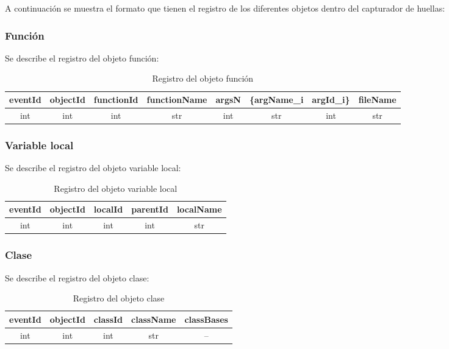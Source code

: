 \documentclass[10pt,a4paper]{article}
\begin{document}
A continuación se muestra el formato que tienen el registro de los diferentes objetos dentro del capturador de huellas:\\

\subsubsection{Función}
Se describe el registro del objeto función:\\

\begin{table}[!h]
\begin{center}
\begin{tabular}{| c | c | c | c | c | c | c | c |}
\hline
eventId & objectId & functionId & functionName & argsN & \{argName_{i} & argId_{i}\} & fileName\\
\hline
int & int & int & str & int & str & int & str\\
\hline
\end{tabular}
\caption{Registro del objeto función} 
\end{center}
\end{table}

\subsubsection{Variable local}
Se describe el registro del objeto variable local:\\

\begin{table}[!h]
\begin{center}
\begin{tabular}{| c | c | c | c | c |}
\hline
eventId & objectId & localId & parentId & localName\\
\hline
int & int & int & int & str\\
\hline
\end{tabular}
\caption{Registro del objeto variable local} 
\end{center}
\end{table}

\subsubsection{Clase}
Se describe el registro del objeto clase:\\

\begin{table}[!h]
\begin{center}
\begin{tabular}{| c | c | c | c | c |}
\hline
eventId & objectId & classId & className & classBases\\
\hline
int & int & int & str & --\footnotemark[1]\\
\hline
\end{tabular}
\caption{Registro del objeto clase} 
\end{center}
\end{table}
\end{document}
